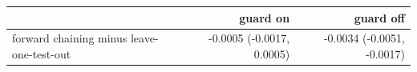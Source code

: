 \begin{tabular}{lrr}
\toprule
 & guard on & guard off \\
\midrule
forward chaining minus leave-one-test-out & -0.0005 (-0.0017, 0.0005) & -0.0034 (-0.0051, -0.0017) \\
\bottomrule
\end{tabular}
